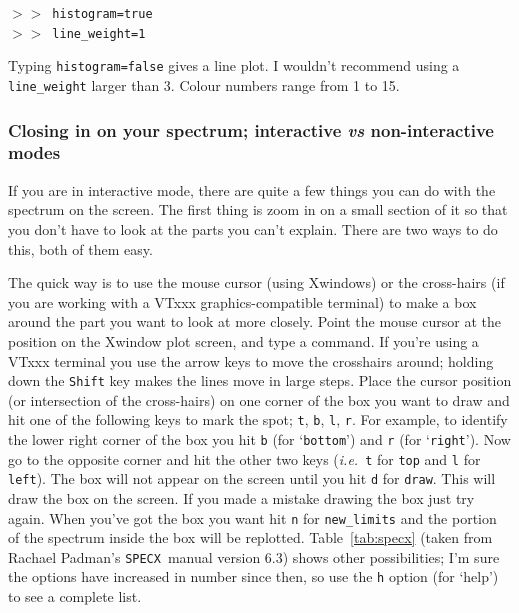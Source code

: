 \documentclass[11pt,twoside]{starlink}
\providecommand{\ie}{\textit{i.e.}}
\providecommand{\SPECX}{\texttt{SPECX}}
\providecommand{\SP}{{$>\!>$}}
\begin{document}
\SP\ \texttt{histogram=true}\\
\SP\ \texttt{line\_weight=1}

Typing \texttt{histogram=false} gives a line plot. I wouldn't recommend
using a \texttt{line\_weight} larger than 3. Colour numbers range from 1 to 15.


\subsubsection{Closing in on your spectrum; interactive \textit{vs}
non-interactive modes}
\label{sec:specx_5.1}
If you are in interactive mode, there are quite a few things
you can do with the spectrum on the screen. The first thing is zoom in
on a small section of it so that you don't have to look at the parts
you can't explain.  There are two ways to do this, both of them easy.

The quick way is to use the mouse cursor (using Xwindows) or the
cross-hairs (if you are working with a VTxxx graphics-compatible
terminal) to make a box around the part you want to look at more
closely. Point the mouse cursor at the position on the Xwindow plot
screen, and type a command. If you're using a VTxxx terminal you use
the arrow keys to move the crosshairs around; holding down the \texttt{Shift} key makes the lines move in large steps.  Place the cursor
position (or intersection of the cross-hairs) on one corner of the box
you want to draw and hit one of the following keys to mark the spot;
\texttt{t}, \texttt{b}, \texttt{l}, \texttt{r}.  For example, to identify the
lower right corner of the box you hit \texttt{b} (for `{\tt{bottom}}') and
\texttt{r} (for `{\tt{right}}'). Now go to the opposite corner and hit the
other two keys (\ie\ \texttt{t} for \texttt{top} and \texttt{l} for \texttt{left}). The box will not appear on the screen until you hit \texttt{d}
for \texttt{draw}.  This will draw the box on the screen. If you made a
mistake drawing the box just try again.  When
you've got the box you want hit \texttt{n} for \texttt{new\_limits} and the
portion of the spectrum inside the box will be replotted.
Table~\ref{tab:specx} (taken from Rachael Padman's \SPECX\ manual
version 6.3) shows other possibilities; I'm sure the options have
increased in number since then, so use the \texttt{h} option (for `help')
to see a complete list.
\end{document}
